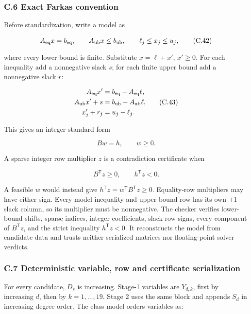 \documentclass[
  english,
  11pt,
  a4paper,
]{article}
\begin{document}
\subsubsection{C.6 Exact Farkas
convention}\label{c.6-exact-farkas-convention}

Before standardization, write a model as

\[
A_{\rm eq}x=b_{\rm eq},\qquad
A_{\rm ub}x\le b_{\rm ub},\qquad
\ell_j\le x_j\le u_j,
\tag{C.42}
\]

where every lower bound is finite. Substitute \(x=\ell+x'\), \(x'\ge0\).
For each inequality add a nonnegative slack \(s\); for each finite upper
bound add a nonnegative slack \(r\):

\[
\begin{aligned}
A_{\rm eq}x'&=b_{\rm eq}-A_{\rm eq}\ell,\\
A_{\rm ub}x'+s&=b_{\rm ub}-A_{\rm ub}\ell,\\
x'_j+r_j&=u_j-\ell_j.
\end{aligned}
\tag{C.43}
\]

This gives an integer standard form

\[
Bw=h,\qquad w\ge0.
\tag{C.44}
\]

A sparse integer row multiplier \(z\) is a contradiction certificate
when

\[
B^{\mathsf T}z\ge0,\qquad h^{\mathsf T}z<0.
\tag{C.45}
\]

A feasible \(w\) would instead give
\(h^{\mathsf T}z=w^{\mathsf T}B^{\mathsf T}z\ge0\). Equality-row
multipliers may have either sign. Every model-inequality and upper-bound
row has its own \(+1\) slack column, so its multiplier must be
nonnegative. The checker verifies lower-bound shifts, sparse indices,
integer coefficients, slack-row signs, every component of
\(B^{\mathsf T}z\), and the strict inequality \(h^{\mathsf T}z<0\). It
reconstructs the model from candidate data and trusts neither serialized
matrices nor floating-point solver verdicts.

\subsubsection{C.7 Deterministic variable, row and certificate
serialization}\label{c.7-deterministic-variable-row-and-certificate-serialization}

For every candidate, \(D_s\) is increasing. Stage-1 variables are
\(Y_{d,k}\), first by increasing \(d\), then by \(k=1,\ldots,19\). Stage
2 uses the same block and appends \(S_d\) in increasing degree order.
The class model orders variables as:
\end{document}
